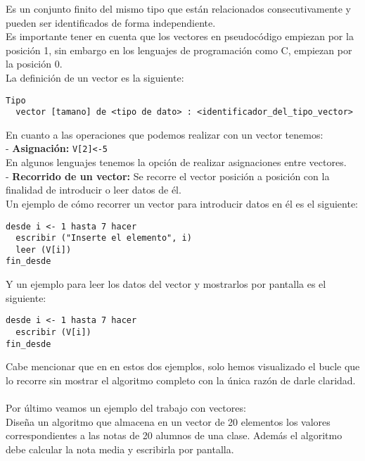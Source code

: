 \documentclass[12pt,letterpaper]{article}
\begin{document}
Es un conjunto finito del mismo tipo que están relacionados consecutivamente y pueden ser identificados de forma independiente.\\
Es importante tener en cuenta que los vectores en pseudocódigo empiezan por la posición 1, sin embargo en los lenguajes de programación como C, empiezan por la posición 0.\\
La definición de un vector es la siguiente:
\begin{lstlisting}
Tipo
  vector [tamano] de <tipo de dato> : <identificador_del_tipo_vector>
\end{lstlisting}
En cuanto a las operaciones que podemos realizar con un vector tenemos:\\
- \textbf{Asignación:} \texttt{V[2]<-5}\\
En algunos lenguajes tenemos la opción de realizar asignaciones entre vectores.\\
\newpage
\noindent
- \textbf{Recorrido de un vector:} Se recorre el vector posición a posición con la finalidad de introducir o leer datos de él.\\
Un ejemplo de cómo recorrer un vector para introducir datos en él es el siguiente:
\begin{lstlisting}
desde i <- 1 hasta 7 hacer
  escribir ("Inserte el elemento", i)
  leer (V[i])
fin_desde
\end{lstlisting}
Y un ejemplo para leer los datos del vector y mostrarlos por pantalla es el siguiente:
\begin{lstlisting}
desde i <- 1 hasta 7 hacer
  escribir (V[i])
fin_desde
\end{lstlisting}
Cabe mencionar que en en estos dos ejemplos, solo hemos visualizado el bucle que lo recorre sin mostrar el algoritmo completo con la única razón de darle claridad.\\\\
Por último veamos un ejemplo del trabajo con vectores:\\
Diseña un algoritmo que almacena en un vector de 20 elementos los valores correspondientes a las notas de 20 alumnos de una clase. Además el algoritmo debe calcular la nota media y escribirla por pantalla.
\end{document}
